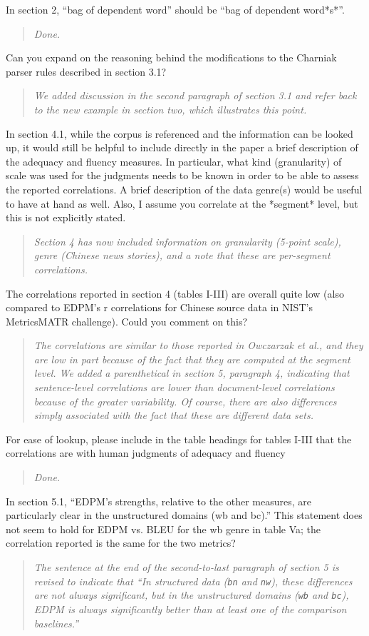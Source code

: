 \documentclass[letterpaper,12pt]{article}
\newenvironment{response}
{\begin{quotation} \it}
  {\end{quotation}}
\begin{document}
In section 2, ``bag of dependent word'' should be ``bag of dependent
word*s*''.
\begin{response}
  Done.
\end{response}
Can you expand on the reasoning behind the modifications to the
Charniak parser rules described in section 3.1?
\begin{response}
  We added discussion in the second paragraph of section 3.1 and refer back to the new example in
  section two, which illustrates this point. 
\end{response}
In section 4.1, while the corpus is referenced and the information can
be looked up, it would still be helpful to include directly in the
paper a brief description of the adequacy and fluency measures.  In
particular, what kind (granularity) of scale was used for the
judgments needs to be known in order to be able to assess the reported
correlations.  A brief description of the data genre(s) would be
useful to have at hand as well.  Also, I assume you correlate at the
*segment* level, but this is not explicitly stated.
\begin{response}
  Section 4 has now included information on granularity (5-point scale),
genre (Chinese news stories), and a note that these are per-segment correlations.
\end{response}
The correlations reported in section 4 (tables I-III) are overall
quite low (also compared to EDPM's r correlations for Chinese source
data in NIST's MetricsMATR challenge).  Could you comment on this?
\begin{response}
 The correlations are similar to those reported in Owczarzak et al., and they
are low in part because of the fact that they are computed at the segment level.
We added a parenthetical in section 5, paragraph 4, indicating that sentence-level correlations are lower than document-level correlations because of the greater variability.  Of course, there are also differences simply associated with the fact that these are different data sets.
\end{response}
For ease of lookup, please include in the table headings for tables
I-III that the correlations are with human judgments of adequacy and
fluency
\begin{response}
  Done.
\end{response}

In section 5.1, ``EDPM's strengths, relative to the other measures, are
particularly clear in the unstructured domains (wb and bc).''  This
statement does not seem to hold for EDPM vs. BLEU for the wb genre in
table Va; the correlation reported is the same for the two metrics?
\begin{response}
  The sentence at the end of the second-to-last paragraph of section 5
  is revised to indicate that ``In structured data (\texttt{bn} and
  \texttt{nw}), these differences are not always significant, but in
  the unstructured domains (\texttt{wb} and \texttt{bc}), EDPM is
  always significantly better than at least one of the comparison
  baselines.''
\end{response}
\end{document}
